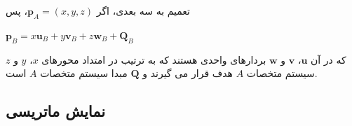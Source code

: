 {\begin{spacing}{1.5}
        تعمیم به سه بعدی، اگر $\textbf{p}_{A}=(x, y, z)$، پس

        \begin{center}
            $\textbf{p}_{B}=x\textbf{u}_{B}+y\textbf{v}_{B}+z\textbf{w}_{B}+\textbf{Q}_{B}$
        \end{center}

        که در آن $\textbf{u}$، $\textbf{v}$ و $\textbf{w}$ بردارهای واحدی هستند که به ترتیب در امتداد محورهای $x$، $y$ و $z$ سیستم متخصات $A$ هدف قرار می گیرند و $\textbf{Q}$ مبدا سیستم متخصات $A$ است.
    \end{spacing}
}

\subsection{\textbf{نمایش ماتریسی}}
\label{subsec:3.4.3}
